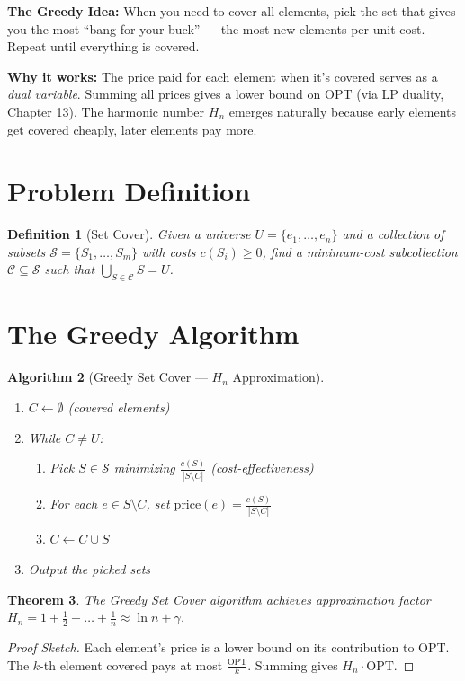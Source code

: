 \documentclass[11pt,oneside]{book}
\newtheorem{theorem}{Theorem}[chapter]
\newtheorem{definition}[theorem]{Definition}
\newtheorem{algorithmdef}[theorem]{Algorithm}
\newcommand{\OPT}{\mathrm{OPT}}
\begin{document}
\begin{intuitionbox}
\textbf{The Greedy Idea:} When you need to cover all elements, pick the set that gives you the most ``bang for your buck'' — the most new elements per unit cost. Repeat until everything is covered.

\textbf{Why it works:} The price paid for each element when it's covered serves as a \emph{dual variable}. Summing all prices gives a lower bound on OPT (via LP duality, Chapter 13). The harmonic number $H_n$ emerges naturally because early elements get covered cheaply, later elements pay more.
\end{intuitionbox}

\section{Problem Definition}

\begin{definition}[Set Cover]
Given a universe $U = \{e_1, \dots, e_n\}$ and a collection of subsets $\mathcal{S} = \{S_1, \dots, S_m\}$ with costs $c(S_i) \geq 0$, find a minimum-cost subcollection $\mathcal{C} \subseteq \mathcal{S}$ such that $\bigcup_{S \in \mathcal{C}} S = U$.
\end{definition}

\section{The Greedy Algorithm}

\begin{algorithmdef}[Greedy Set Cover — $H_n$ Approximation]
\begin{enumerate}
    \item $C \gets \emptyset$ (covered elements)
    \item While $C \neq U$:
    \begin{enumerate}
        \item Pick $S \in \mathcal{S}$ minimizing $\frac{c(S)}{|S \setminus C|}$ (cost-effectiveness)
        \item For each $e \in S \setminus C$, set $\text{price}(e) = \frac{c(S)}{|S \setminus C|}$
        \item $C \gets C \cup S$
    \end{enumerate}
    \item Output the picked sets
\end{enumerate}
\end{algorithmdef}

\begin{theorem}
The Greedy Set Cover algorithm achieves approximation factor $H_n = 1 + \frac{1}{2} + \dots + \frac{1}{n} \approx \ln n + \gamma$.
\end{theorem}
\begin{proof}[Proof Sketch]
Each element's price is a lower bound on its contribution to OPT. The $k$-th element covered pays at most $\frac{\OPT}{k}$. Summing gives $H_n \cdot \OPT$.
\end{proof}
\end{document}
